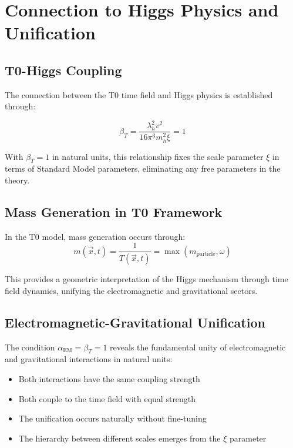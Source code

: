 \documentclass[12pt,a4paper]{article}
\newcommand{\Tfieldt}{T(\vec{x},t)}
\begin{document}
	\section{Connection to Higgs Physics and Unification}
	\label{sec:higgs_connection}
	
	\subsection{T0-Higgs Coupling}
	\label{subsec:t0_higgs_coupling}
	
	The connection between the T0 time field and Higgs physics is established through:
	
	\begin{equation}
		\beta_T = \frac{\lambda_h^2 v^2}{16\pi^3 m_h^2 \xi} = 1
		\label{eq:higgs_connection}
	\end{equation}
	
	With $\beta_T = 1$ in natural units, this relationship fixes the scale parameter $\xi$ in terms of Standard Model parameters, eliminating any free parameters in the theory.
	
	\subsection{Mass Generation in T0 Framework}
	\label{subsec:mass_generation_t0}
	
	In the T0 model, mass generation occurs through:
	\begin{equation}
		m(\vec{x},t) = \frac{1}{\Tfieldt} = \max(m_{\text{particle}}, \omega)
		\label{eq:t0_mass_generation}
	\end{equation}
	
	This provides a geometric interpretation of the Higgs mechanism through time field dynamics, unifying the electromagnetic and gravitational sectors.
	
	\subsection{Electromagnetic-Gravitational Unification}
	\label{subsec:em_grav_unification}
	
	The condition $\alpha_{\text{EM}} = \beta_T = 1$ reveals the fundamental unity of electromagnetic and gravitational interactions in natural units:
	
	\begin{itemize}
		\item Both interactions have the same coupling strength
		\item Both couple to the time field with equal strength
		\item The unification occurs naturally without fine-tuning
		\item The hierarchy between different scales emerges from the $\xi$ parameter
	\end{itemize}
	
\end{document}

